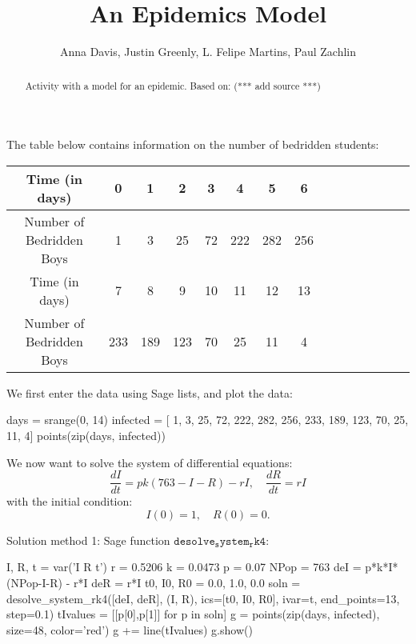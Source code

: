 \documentclass{ximera}
\title{An Epidemics Model}
\author{Anna Davis, Justin Greenly, L. Felipe Martins, Paul Zachlin}
\begin{document}
\begin{abstract}
Activity with a model for an epidemic. Based on: (*** add source ***)
\end{abstract}

\maketitle

The table below contains information on the number of bedridden students:

\begin{tabular}{|c|c|c|c|c|c|c|c|c|c|c|c|c|c|c|}\hline
Time (in days)           & 0 & 1 &  2 &  3 &  4 &    5 &   6  \\\hline
Number of Bedridden Boys & 1 & 3 & 25 & 72 & 222 & 282 & 256 \\\hline\hline
Time (in days) &             7 &   8 &   9 & 10 & 11 & 12 & 13\\\hline
Number of Bedridden Boys & 233 & 189 & 123 & 70 & 25 & 11 &  4\\\hline
\end{tabular}

We first enter the data using Sage lists, and plot the data:

\begin{sageCell}
days = srange(0, 14)
infected = [  1,   3,  25, 72, 222, 282, 256, 
            233, 189, 123, 70,  25,  11,   4]
points(zip(days, infected))
\end{sageCell}

We now want to solve the system of differential equations:
\[
\frac{dI}{dt}=pk(763-I-R)-rI,\quad\frac{dR}{dt}=rI
\]
with the initial condition:
\[
I(0)=1,\quad R(0)=0.
\]

Solution method 1: Sage function $\mathtt{desolve_system_rk4}$:

\begin{sageCell}
I, R, t = var('I R t')
r = 0.5206
k = 0.0473
p = 0.07
NPop = 763
deI = p*k*I*(NPop-I-R) - r*I
deR = r*I
t0, I0, R0 = 0.0, 1.0, 0.0
soln = desolve_system_rk4([deI, deR], (I, R), 
                          ics=[t0, I0, R0], ivar=t,
                          end_points=13, step=0.1)
tIvalues = [[p[0],p[1]] for p in soln]
g = points(zip(days, infected), size=48, color='red')
g += line(tIvalues)
g.show()
\end{sageCell}
\end{document}
